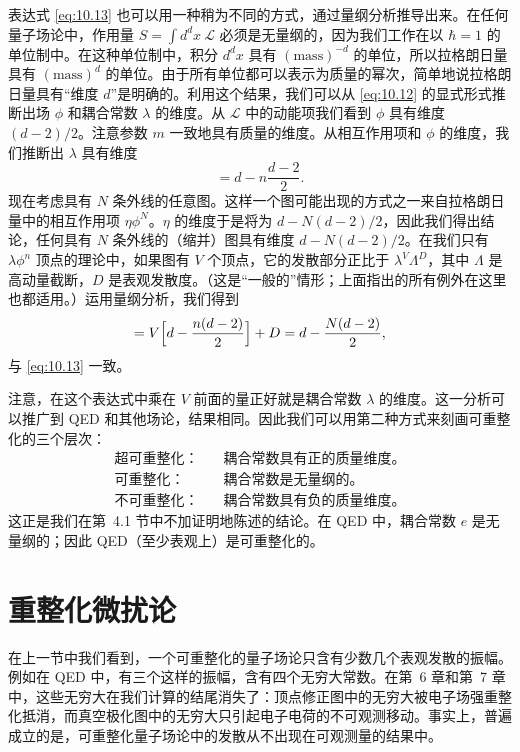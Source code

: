 表达式 \eqref{eq:10.13} 也可以用一种稍为不同的方式，通过量纲分析推导出来。在任何量子场论中，作用量 $S = \int d^dx\ \mathcal{L}$ 必须是无量纲的，因为我们工作在以 $\hbar = 1$ 的单位制中。在这种单位制中，积分 $d^dx$ 具有 $(\mathrm{mass})^{-d}$ 的单位，所以拉格朗日量具有 $(\mathrm{mass})^d$ 的单位。由于所有单位都可以表示为质量的幂次，简单地说拉格朗日量具有``维度 $d$''是明确的。利用这个结果，我们可以从 \eqref{eq:10.12} 的显式形式推断出场 $\phi$ 和耦合常数 $\lambda$ 的维度。从 $\mathcal{L}$ 中的动能项我们看到 $\phi$ 具有维度 $(d-2)/2$。注意参数 $m$ 一致地具有质量的维度。从相互作用项和 $\phi$ 的维度，我们推断出 $\lambda$ 具有维度
\begin{equation}
  [\lambda] = d - n\frac{d-2}{2} .
\end{equation}
现在考虑具有 $N$ 条外线的任意图。这样一个图可能出现的方式之一来自拉格朗日量中的相互作用项 $\eta\phi^N$。$\eta$ 的维度于是将为 $d - N(d-2)/2$，因此我们得出结论，任何具有 $N$ 条外线的（缩并）图具有维度 $d - N(d-2)/2$。在我们只有 $\lambda\phi^n$ 顶点的理论中，如果图有 $V$ 个顶点，它的发散部分正比于 $\lambda^V\Lambda^D$，其中 $\Lambda$ 是高动量截断，$D$ 是表观发散度。（这是``一般的''情形；上面指出的所有例外在这里也都适用。）运用量纲分析，我们得到
\begin{equation}
  [\lambda^V\Lambda^D] = V\Bigl[ d - \frac{n(d-2)}{2} \Bigr] + D
  = d - \frac{N(d-2)}{2},
\end{equation}
与 \eqref{eq:10.13} 一致。

注意，在这个表达式中乘在 $V$ 前面的量正好就是耦合常数 $\lambda$ 的维度。这一分析可以推广到 QED 和其他场论，结果相同。因此我们可以用第二种方式来刻画可重整化的三个层次：
\begin{equation}
  \begin{aligned}
    \text{超可重整化：}\quad & \text{耦合常数具有正的质量维度。}\\
    \text{可重整化：}\quad & \text{耦合常数是无量纲的。}\\
    \text{不可重整化：}\quad & \text{耦合常数具有负的质量维度。}
  \end{aligned}
\end{equation}
这正是我们在第~4.1 节中不加证明地陈述的结论。在 QED 中，耦合常数 $e$ 是无量纲的；因此 QED（至少表观上）是可重整化的。

\section{重整化微扰论}

在上一节中我们看到，一个可重整化的量子场论只含有少数几个表观发散的振幅。例如在 QED 中，有三个这样的振幅，含有四个无穷大常数。在第~6 章和第~7 章中，这些无穷大在我们计算的结尾消失了：顶点修正图中的无穷大被电子场强重整化抵消，而真空极化图中的无穷大只引起电子电荷的不可观测移动。事实上，普遍成立的是，可重整化量子场论中的发散从不出现在可观测量的结果中。

